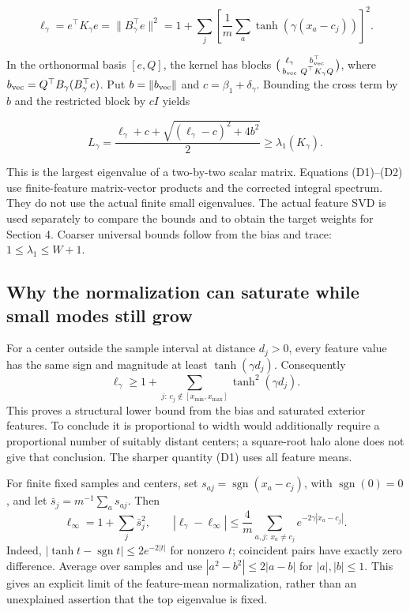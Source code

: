 \documentclass[11pt]{article}
\begin{document}
\[
\ell_\gamma=e^\top K_\gamma e
=\|B_\gamma^\top e\|^2
=1+\sum_j\left[\frac1m\sum_a\tanh(\gamma(x_a-c_j))\right]^2.
\tag{D1}
\]

In the orthonormal basis \([e,Q]\), the kernel has blocks \(\bigl(\begin{smallmatrix}\ell_\gamma&b_{\rm vec}^\top\\b_{\rm vec}&Q^\top K_\gamma Q\end{smallmatrix}\bigr)\), where \(b_{\rm vec}=Q^\top B_\gamma(B_\gamma^\top e)\). Put \(b=\|b_{\rm vec}\|\) and \(c=\beta_1+\delta_\gamma\). Bounding the cross term by \(b\) and the restricted block by \(cI\) yields

\[
L_\gamma=
\frac{\ell_\gamma+c+\sqrt{(\ell_\gamma-c)^2+4b^2}}2
\ge\lambda_1(K_\gamma).
\tag{D2}
\]

This is the largest eigenvalue of a two-by-two scalar matrix. Equations (D1)--(D2) use finite-feature matrix-vector products and the corrected integral spectrum. They do not use the actual finite small eigenvalues. The actual feature SVD is used separately to compare the bounds and to obtain the target weights for Section 4. Coarser universal bounds follow from the bias and trace: \(1\le\lambda_1\le W+1\).


\subsection{Why the normalization can saturate while small modes still grow}

For a center outside the sample interval at distance \(d_j>0\), every feature value has the same sign and magnitude at least \(\tanh(\gamma d_j)\). Consequently
\[
\ell_\gamma\ge1+\sum_{j:\,c_j\notin[x_{\min},x_{\max}]}
\tanh^2(\gamma d_j).
\tag{D3}
\]
This proves a structural lower bound from the bias and saturated exterior features. To conclude it is proportional to width would additionally require a proportional number of suitably distant centers; a square-root halo alone does not give that conclusion. The sharper quantity (D1) uses all feature means.

For finite fixed samples and centers, set \(s_{aj}=\operatorname{sgn}(x_a-c_j)\), with \(\operatorname{sgn}(0)=0\), and let
\(\bar s_j=m^{-1}\sum_a s_{aj}\). Then
\[
\ell_\infty=1+\sum_j\bar s_j^2,
\qquad
|\ell_\gamma-\ell_\infty|
\le\frac4m\sum_{a,j:\,x_a\ne c_j}e^{-2\gamma|x_a-c_j|}.
\tag{D4}
\]
Indeed, \(|\tanh t-\operatorname{sgn}t|\le2e^{-2|t|}\) for nonzero \(t\); coincident pairs have exactly zero difference. Average over samples and use \(|a^2-b^2|\le2|a-b|\) for \(|a|,|b|\le1\). This gives an explicit limit of the feature-mean normalization, rather than an unexplained assertion that the top eigenvalue is fixed.
\end{document}
